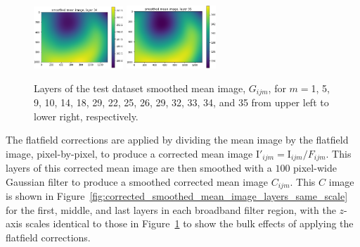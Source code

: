 \documentclass[letterpaper,11pt]{article}
\newcommand{\reffig}[1]{Figure~\ref{#1}}
\newcommand{\Iota}{\mathrm{I}}
\begin{document}
\begin{figure}[!ht]
\includegraphics[width=0.3\textwidth]{images/results/smoothed_mean_image_layers/smoothed_mean_image_layer_34}
\includegraphics[width=0.3\textwidth]{images/results/smoothed_mean_image_layers/smoothed_mean_image_layer_35}
\caption{\footnotesize Layers of the test dataset smoothed mean image, $G_{ijm}$, for $m=$1, 5, 9, 10, 14, 18, 29, 22, 25, 26, 29, 32, 33, 34, and 35 from upper left to lower right, respectively.}
\label{fig:uncorrected_mean_image_layers}
\end{figure}

The flatfield corrections are applied by dividing the mean image by the flatfield image, pixel-by-pixel, to produce a corrected mean image $\Iota'_{ijm}=\Iota_{ijm}/F_{ijm}$. This layers of this corrected mean image are then smoothed with a $100$ pixel-wide Gaussian filter to produce a smoothed corrected mean image $C_{ijm}$. This $C$ image is shown in \reffig{fig:corrected_smoothed_mean_image_layers_same_scale} for the first, middle, and last layers in each broadband filter region, with the $z$-axis scales identical to those in \reffig{fig:uncorrected_mean_image_layers} to show the bulk effects of applying the flatfield corrections.
\end{document}
